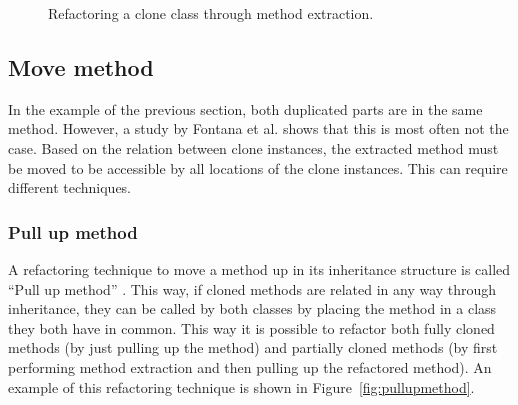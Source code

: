 \begin{figure}[H]
\begin{parcolumns}{2}
\end{parcolumns}
\caption{Refactoring a clone class through method extraction.}
\label{fig:extractmethod}
\end{figure}

\subsection{Move method}
In the example of the previous section, both duplicated parts are in the same method. However, a study by Fontana et al. \cite{fontana2015duplicated} shows that this is most often not the case. Based on the relation between clone instances, the extracted method must be moved to be accessible by all locations of the clone instances. This can require different techniques.

\subsubsection{Pull up method}
A refactoring technique to move a method up in its inheritance structure is called ``Pull up method'' \cite{fowler2018refactoring}. This way, if cloned methods are related in any way through inheritance, they can be called by both classes by placing the method in a class they both have in common. This way it is possible to refactor both fully cloned methods (by just pulling up the method) and partially cloned methods (by first performing method extraction and then pulling up the refactored method). An example of this refactoring technique is shown in Figure~\ref{fig:pullupmethod}.

